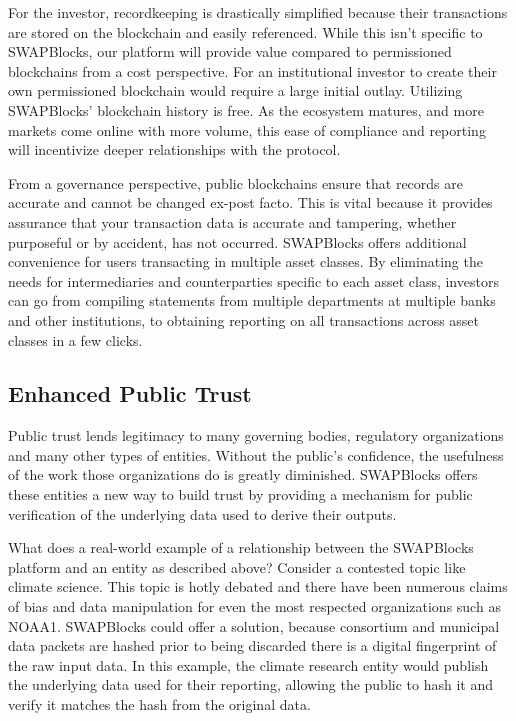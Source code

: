 \documentclass[12pt]{article}
\begin{document}
For the investor, recordkeeping is drastically simplified because their transactions are stored on the blockchain and easily referenced. While this isn’t specific to SWAPBlocks, our platform will provide value compared to permissioned blockchains from a cost perspective. For an institutional investor to create their own permissioned blockchain would require a large initial outlay. Utilizing SWAPBlocks’ blockchain history is free. As the ecosystem matures, and more markets come online with more volume, this ease of compliance and reporting will incentivize deeper relationships with the protocol.

From a governance perspective, public blockchains ensure that records are accurate and cannot be changed ex-post facto. This is vital because it provides assurance that your transaction data is accurate and tampering, whether purposeful or by accident, has not occurred. SWAPBlocks offers additional convenience for users transacting in multiple asset classes. By eliminating the needs for intermediaries and counterparties specific to each asset class, investors can go from compiling statements from multiple departments at multiple banks and other institutions, to obtaining reporting on all transactions across asset classes in a few clicks.

\subsection{Enhanced Public Trust}
Public trust lends legitimacy to many governing bodies, regulatory organizations and many other types of entities. Without the public’s confidence, the usefulness of the work those organizations do is greatly diminished. SWAPBlocks offers these entities a new way to build trust by providing a mechanism for public verification of the underlying data used to derive their outputs.

What does a real-world example of a relationship between the SWAPBlocks platform and an entity as described above? Consider a contested topic like climate science. This topic is hotly debated and there have been numerous claims of bias and data manipulation for even the most respected organizations such as NOAA1. SWAPBlocks could offer a solution, because consortium and municipal data packets are hashed prior to being discarded there is a digital fingerprint of the raw input data. In this example, the climate research entity would publish the underlying data used for their reporting, allowing the public to hash it and verify it matches the hash from the original data.
\end{document}
